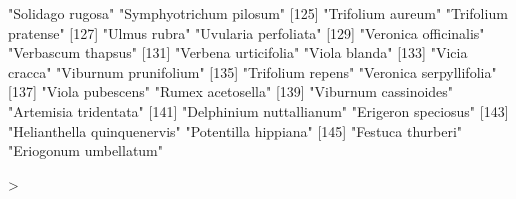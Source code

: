 \documentclass{article}
\begin{document}
\begin{Schunk}
\begin{Soutput}
[123] "Solidago rugosa"               "Symphyotrichum pilosum"       
[125] "Trifolium aureum"              "Trifolium pratense"           
[127] "Ulmus rubra"                   "Uvularia perfoliata"          
[129] "Veronica officinalis"          "Verbascum thapsus"            
[131] "Verbena urticifolia"           "Viola blanda"                 
[133] "Vicia cracca"                  "Viburnum prunifolium"         
[135] "Trifolium repens"              "Veronica serpyllifolia"       
[137] "Viola pubescens"               "Rumex acetosella"             
[139] "Viburnum cassinoides"          "Artemisia tridentata"         
[141] "Delphinium nuttallianum"       "Erigeron speciosus"           
[143] "Helianthella quinquenervis"    "Potentilla hippiana"          
[145] "Festuca thurberi"              "Eriogonum umbellatum"         
\end{Soutput}
\begin{Sinput}
> 
\end{Sinput}
\end{Schunk}
\end{document}
